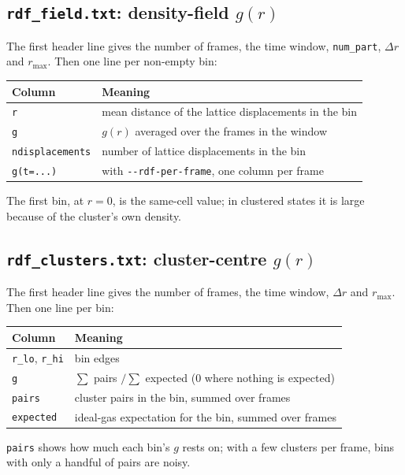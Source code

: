 \documentclass[11pt]{article}
\newcommand{\code}[1]{\texttt{#1}}
\begin{document}
\subsection*{\texorpdfstring{\code{rdf\_field.txt}: density-field $g(r)$}{rdf_field.txt}}
The first header line gives the number of frames, the time window,
\code{num\_part}, $\Delta r$ and $r_{\max}$. Then one line per non-empty bin:
\begin{center}
\begin{tabularx}{\textwidth}{@{}l L@{}}
\toprule
Column & Meaning \\
\midrule
\code{r} & mean distance of the lattice displacements in the bin \\
\code{g} & $g(r)$ averaged over the frames in the window \\
\code{ndisplacements} & number of lattice displacements in the bin \\
\code{g(t=...)} & with \code{-{}-rdf-per-frame}, one column per frame \\
\bottomrule
\end{tabularx}
\end{center}
The first bin, at $r=0$, is the same-cell value; in clustered states it is
large because of the cluster's own density.

\subsection*{\texorpdfstring{\code{rdf\_clusters.txt}: cluster-centre $g(r)$}{rdf_clusters.txt}}
The first header line gives the number of frames, the time window, $\Delta r$
and $r_{\max}$. Then one line per bin:
\begin{center}
\begin{tabularx}{\textwidth}{@{}l L@{}}
\toprule
Column & Meaning \\
\midrule
\code{r\_lo}, \code{r\_hi} & bin edges \\
\code{g} & $\sum$ pairs $/ \sum$ expected (0 where nothing is expected) \\
\code{pairs} & cluster pairs in the bin, summed over frames \\
\code{expected} & ideal-gas expectation for the bin, summed over frames \\
\bottomrule
\end{tabularx}
\end{center}
\code{pairs} shows how much each bin's $g$ rests on; with a few clusters per
frame, bins with only a handful of pairs are noisy.
\end{document}
